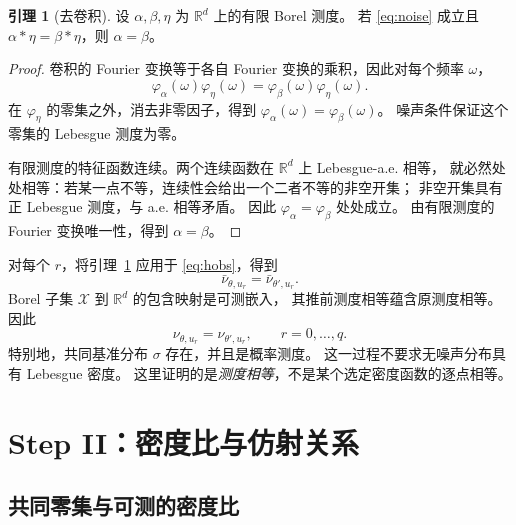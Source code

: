 \documentclass[UTF8,fontset=fandol,11pt,a4paper]{ctexart}
\theoremstyle{definition}
\newtheorem{lemma}{引理}
\newcommand{\R}{\mathbb R}
\newcommand{\Xset}{\mathcal X}
\begin{document}
\begin{lemma}[去卷积]\label{lem:deconv}
设 $\alpha,\beta,\eta$ 为 $\R^d$ 上的有限 Borel 测度。
若 \eqref{eq:noise} 成立且 $\alpha*\eta=\beta*\eta$，则 $\alpha=\beta$。
\end{lemma}
\begin{proof}
卷积的 Fourier 变换等于各自 Fourier 变换的乘积，因此对每个频率 $\omega$，
\[
 \varphi_\alpha(\omega)\varphi_\eta(\omega)
 =\varphi_\beta(\omega)\varphi_\eta(\omega).
\]
在 $\varphi_\eta$ 的零集之外，消去非零因子，得到
$\varphi_\alpha(\omega)=\varphi_\beta(\omega)$。
噪声条件保证这个零集的 Lebesgue 测度为零。

有限测度的特征函数连续。两个连续函数在 $\R^d$ 上 Lebesgue-a.e. 相等，
就必然处处相等：若某一点不等，连续性会给出一个二者不等的非空开集；
非空开集具有正 Lebesgue 测度，与 a.e. 相等矛盾。
因此 $\varphi_\alpha=\varphi_\beta$ 处处成立。
由有限测度的 Fourier 变换唯一性，得到 $\alpha=\beta$。
\end{proof}

对每个 $r$，将引理~\ref{lem:deconv} 应用于 \eqref{eq:hobs}，得到
\[
 \bar\nu_{\theta,u_r}=\bar\nu_{\theta',u_r}.
\]
Borel 子集 $\Xset$ 到 $\R^d$ 的包含映射是可测嵌入，
其推前测度相等蕴含原测度相等。因此
\begin{equation}
 \nu_{\theta,u_r}=\nu_{\theta',u_r},\qquad r=0,\ldots,q.
 \label{eq:hlaw}
\end{equation}
特别地，共同基准分布 $\sigma$ 存在，并且是概率测度。
这一过程不要求无噪声分布具有 Lebesgue 密度。
这里证明的是\emph{测度相等}，不是某个选定密度函数的逐点相等。

\section{Step II：密度比与仿射关系}

\subsection{共同零集与可测的密度比}
\end{document}
